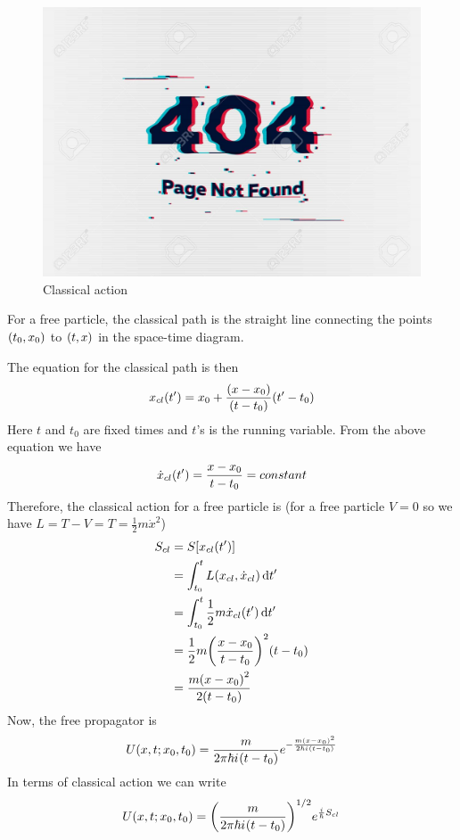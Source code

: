 		
		\begin{figure}
			\centering
			\includegraphics[width=0.5\linewidth]{Pictures/not-found.jpg}
			\caption{Classical action}
		\end{figure}
	
		For a free particle, the classical path is the straight line connecting the points $\qty(t_0, x_0)$ to $\qty(t, x)$ in the space-time diagram.
		
		The equation for the classical path is then
		\begin{equation}
			x_{cl}\qty(t^\prime) = x_0 + \frac{\qty(x-x_0)}{\qty(t-t_0)} \qty(t^\prime - t_0)
		\end{equation}
		Here $t$ and $t_0$ are fixed times and $t$'s is the running variable. From the above equation we have
		\begin{equation}
			\dot{x}_{cl}\qty(t^\prime) = \frac{x-x_0}{t-t_0} = constant
		\end{equation}
		Therefore, the classical action for a free particle is (for a free particle $V=0$ so we have $L=T-V=T=\frac{1}{2} m \dot{x}^2$)
		\begin{align}
			S_{cl} 
			&= S\qty[x_{cl}\qty(t^\prime)] \\
			&= \int_{t_0}^{t} L(x_{cl}, \dot{x}_{cl}) \dd{t^\prime} \\
			&= \int_{t_0}^{t} \frac{1}{2} m \dot{x}_{cl}\qty(t^\prime) \dd{t^\prime} \\
			&= \frac{1}{2} m \qty(\frac{x-x_0}{t-t_0})^2 \qty(t-t_0) \\
			&= \frac{m \qty(x-x_0)^2}{2 \qty(t-t_0)}
		\end{align}
		Now, the free propagator is
		\begin{equation}
			U(x,t;x_0, t_0) = \frac{m}{2\pi \hbar {i\mkern1mu} \qty(t-t_0)} e^{-\frac{m\qty(x-x_0)^2}{2\hbar {i\mkern1mu} \qty(t-t_0)}}
		\end{equation}
		In terms of classical action we can write
		\begin{equation}
			U(x,t;x_0,t_0) = \qty(\frac{m}{2\pi \hbar {i\mkern1mu}\qty(t-t_0)})^{1/2} e^{\frac{i}{\hbar} S_{cl}}
		\end{equation}
		
